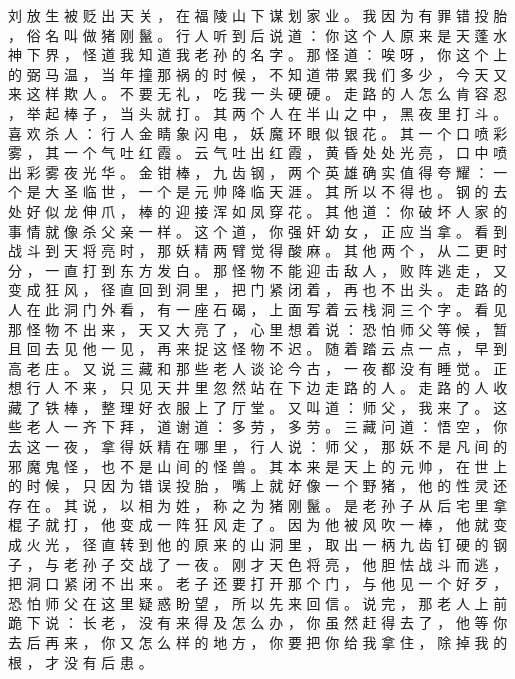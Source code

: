 {刘 放 生 被 贬 出 天 关 ， 在 福 陵 山 下 谋 划 家 业 。
我 因 为 有 罪 错 投 胎 ， 俗 名 叫 做 猪 刚 鬣 。
行 人 听 到 后 说 道 ： 你 这 个 人 原 来 是 天 蓬 水 神 下 界 ， 怪 道 我 知 道 我 老 孙 的 名 字 。
那 怪 道 ： 唉 呀 ， 你 这 个 上 的 弼 马 温 ， 当 年 撞 那 祸 的 时 候 ， 不 知 道 带 累 我 们 多 少 ， 今 天 又 来 这 样 欺 人 。
不 要 无 礼 ， 吃 我 一 头 硬 硬 。
走 路 的 人 怎 么 肯 容 忍 ， 举 起 棒 子 ， 当 头 就 打 。
其 两 个 人 在 半 山 之 中 ， 黑 夜 里 打 斗 。
喜 欢 杀 人 ： 行 人 金 睛 象 闪 电 ， 妖 魔 环 眼 似 银 花 。
其 一 个 口 喷 彩 雾 ， 其 一 个 气 吐 红 霞 。
云 气 吐 出 红 霞 ， 黄 昏 处 处 光 亮 ， 口 中 喷 出 彩 雾 夜 光 华 。
金 钳 棒 ， 九 齿 钢 ， 两 个 英 雄 确 实 值 得 夸 耀 ： 一 个 是 大 圣 临 世 ， 一 个 是 元 帅 降 临 天 涯 。
其 所 以 不 得 也 。
钢 的 去 处 好 似 龙 伸 爪 ， 棒 的 迎 接 浑 如 凤 穿 花 。
其 他 道 ： 你 破 坏 人 家 的 事 情 就 像 杀 父 亲 一 样 。 这 个 道 ， 你 强 奸 幼 女 ， 正 应 当 拿 。
看 到 战 斗 到 天 将 亮 时 ， 那 妖 精 两 臂 觉 得 酸 麻 。
其 他 两 个 ， 从 二 更 时 分 ， 一 直 打 到 东 方 发 白 。
那 怪 物 不 能 迎 击 敌 人 ， 败 阵 逃 走 ， 又 变 成 狂 风 ， 径 直 回 到 洞 里 ， 把 门 紧 闭 着 ， 再 也 不 出 头 。
走 路 的 人 在 此 洞 门 外 看 ， 有 一 座 石 碣 ， 上 面 写 着 云 栈 洞 三 个 字 。
看 见 那 怪 物 不 出 来 ， 天 又 大 亮 了 ， 心 里 想 着 说 ： 恐 怕 师 父 等 候 ， 暂 且 回 去 见 他 一 见 ， 再 来 捉 这 怪 物 不 迟 。
随 着 踏 云 点 一 点 ， 早 到 高 老 庄 。
又 说 三 藏 和 那 些 老 人 谈 论 今 古 ， 一 夜 都 没 有 睡 觉 。
正 想 行 人 不 来 ， 只 见 天 井 里 忽 然 站 在 下 边 走 路 的 人 。
走 路 的 人 收 藏 了 铁 棒 ， 整 理 好 衣 服 上 了 厅 堂 。
又 叫 道 ： 师 父 ， 我 来 了 。
这 些 老 人 一 齐 下 拜 ， 道 谢 道 ： 多 劳 ， 多 劳 。
三 藏 问 道 ： 悟 空 ， 你 去 这 一 夜 ， 拿 得 妖 精 在 哪 里 ， 行 人 说 ： 师 父 ， 那 妖 不 是 凡 间 的 邪 魔 鬼 怪 ， 也 不 是 山 间 的 怪 兽 。
其 本 来 是 天 上 的 元 帅 ， 在 世 上 的 时 候 ， 只 因 为 错 误 投 胎 ， 嘴 上 就 好 像 一 个 野 猪 ， 他 的 性 灵 还 存 在 。
其 说 ， 以 相 为 姓 ， 称 之 为 猪 刚 鬣 。
是 老 孙 子 从 后 宅 里 拿 棍 子 就 打 ， 他 变 成 一 阵 狂 风 走 了 。
因 为 他 被 风 吹 一 棒 ， 他 就 变 成 火 光 ， 径 直 转 到 他 的 原 来 的 山 洞 里 ， 取 出 一 柄 九 齿 钉 硬 的 钢 子 ， 与 老 孙 子 交 战 了 一 夜 。
刚 才 天 色 将 亮 ， 他 胆 怯 战 斗 而 逃 ， 把 洞 口 紧 闭 不 出 来 。
老 子 还 要 打 开 那 个 门 ， 与 他 见 一 个 好 歹 ， 恐 怕 师 父 在 这 里 疑 惑 盼 望 ， 所 以 先 来 回 信 。
说 完 ， 那 老 人 上 前 跪 下 说 ： 长 老 ， 没 有 来 得 及 怎 么 办 ， 你 虽 然 赶 得 去 了 ， 他 等 你 去 后 再 来 ， 你 又 怎 么 样 的 地 方 ， 你 要 把 你 给 我 拿 住 ， 除 掉 我 的 根 ， 才 没 有 后 患 。
}

